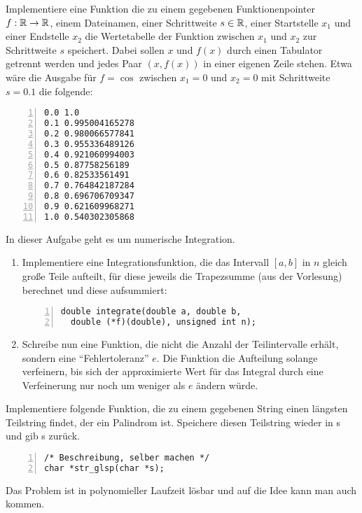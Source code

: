 \documentclass{uebungszettel}
\begin{document}
\begin{aufg} Implementiere eine Funktion die zu einem gegebenen Funktionenpointer $f:\mathbb{R} \rightarrow \mathbb{R}$, einem Dateinamen, einer Schrittweite $s \in \mathbb{R}$, einer Startstelle $x_1$ und einer Endstelle $x_2$ die Wertetabelle der Funktion zwischen $x_1$ und $x_2$ zur Schrittweite $s$ speichert. Dabei sollen $x$ und $f(x)$ durch einen Tabulator getrennt werden und jedes Paar $(x, f(x))$ in einer eigenen Zeile stehen. Etwa wäre die Ausgabe für $f=\cos$ zwischen $x_1=0$ und $x_2=0$ mit Schrittweite $s=0.1$ die folgende:
\begin{codelisting}
\begin{lstlisting}[numbers=left,numberstyle=\tiny,frame=tlrb]
0.0 1.0
0.1 0.995004165278
0.2 0.980066577841
0.3 0.955336489126
0.4 0.921060994003
0.5 0.87758256189
0.6 0.82533561491
0.7 0.764842187284
0.8 0.696706709347
0.9 0.621609968271
1.0 0.540302305868
\end{lstlisting}
\end{codelisting}
\end{aufg}

\begin{aufg}
In dieser Aufgabe geht es um numerische Integration.
\begin{enumerate}
\item Implementiere eine Integrationsfunktion, die das Intervall $[a, b]$ in $n$ gleich große Teile aufteilt, für diese jeweils die Trapezsumme (aus der Vorlesung) berechnet und diese aufsummiert:

\begin{codelisting}
\begin{lstlisting}[numbers=left,numberstyle=\tiny,frame=tlrb]
double integrate(double a, double b, 
  double (*f)(double), unsigned int n); 
\end{lstlisting}
\end{codelisting}

\item Schreibe nun eine Funktion, die nicht die Anzahl der Teilintervalle erhält, sondern eine ``Fehlertoleranz'' $e$. Die Funktion die Aufteilung solange verfeinern, bis sich der approximierte Wert für das Integral durch eine Verfeinerung nur noch um weniger als $e$ ändern würde. 
\end{enumerate}
\end{aufg}

\begin{aufg}
Implementiere folgende Funktion, die zu einem gegebenen String einen längsten Teilstring findet, der ein Palindrom ist. Speichere diesen Teilstring wieder in s und gib s zurück.
\begin{codelisting}
\begin{lstlisting}[numbers=left,numberstyle=\tiny,frame=tlrb]
/* Beschreibung, selber machen */
char *str_glsp(char *s);
\end{lstlisting}
\end{codelisting}
Das Problem ist in polynomieller Laufzeit lösbar und auf die Idee kann man auch kommen. 
\end{aufg}
\end{document}
